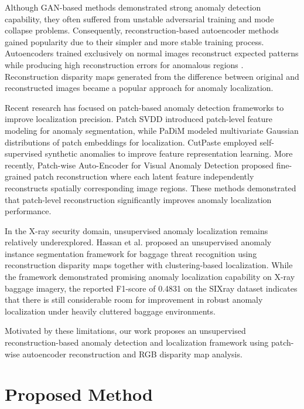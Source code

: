 \documentclass{bmvc2k}
\begin{document}
Although GAN-based methods demonstrated strong anomaly detection capability, they often suffered from unstable adversarial training and mode collapse problems. Consequently, reconstruction-based autoencoder methods gained popularity due to their simpler and more stable training process. Autoencoders trained exclusively on normal images reconstruct expected patterns while producing high reconstruction errors for anomalous regions \cite{bergmann2019mvtec}. Reconstruction disparity maps generated from the difference between original and reconstructed images became a popular approach for anomaly localization.

Recent research has focused on patch-based anomaly detection frameworks to improve localization precision. Patch SVDD \cite{yi2020patchsvdd} introduced patch-level feature modeling for anomaly segmentation, while PaDiM \cite{defard2020padim} modeled multivariate Gaussian distributions of patch embeddings for localization. CutPaste \cite{li2021cutpaste} employed self-supervised synthetic anomalies to improve feature representation learning. More recently, Patch-wise Auto-Encoder for Visual Anomaly Detection \cite{patchae2023} proposed fine-grained patch reconstruction where each latent feature independently reconstructs spatially corresponding image regions. These methods demonstrated that patch-level reconstruction significantly improves anomaly localization performance.

In the X-ray security domain, unsupervised anomaly localization remains relatively underexplored. Hassan et al. \cite{hassan2021unsupervised} proposed an unsupervised anomaly instance segmentation framework for baggage threat recognition using reconstruction disparity maps together with clustering-based localization. While the framework demonstrated promising anomaly localization capability on X-ray baggage imagery, the reported F1-score of 0.4831 on the SIXray dataset indicates that there is still considerable room for improvement in robust anomaly localization under heavily cluttered baggage environments.

Motivated by these limitations, our work proposes an unsupervised reconstruction-based anomaly detection and localization framework using patch-wise autoencoder reconstruction and RGB disparity map analysis.

\section{Proposed Method}
\end{document}
